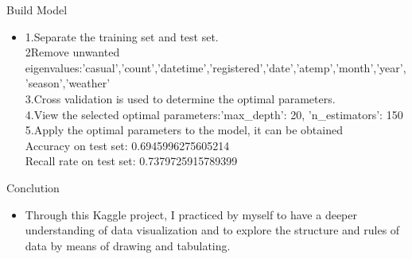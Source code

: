 \documentclass[
 size=14pt,
 paper=smartboard,  %
 mode=present, 		%
 display=slides, 	%
 style=tuliplab,  	%
 pauseslide,
 fleqn,leqno]{powerdot}
\begin{document}
\begin{slide}{Build Model}
  \begin{center}
  
  {
  \begin{itemize}
  \item 
  1.Separate the training set and test set.\\
  2Remove unwanted eigenvalues:'casual','count','datetime','registered','date','atemp','month','year','season','weather'\\
  3.Cross validation is used to determine the optimal parameters.\\
  4.View the selected optimal parameters:{'max_depth': 20, 'n_estimators': 150}\\
  5.Apply the optimal parameters to the model, it can be obtained\\
  Accuracy on test set:  0.6945996275605214\\
  Recall rate on test set: 0.7379725915789399\\
  \end{itemize}
  }
  
  \end{center}
  \bigskip
  \begin{center}
  
  \end{center}
  \bigskip
\end{slide}


\begin{slide}{Conclution}
  \begin{center}
  
  {
  \begin{itemize}
  \item 
  Through this Kaggle project, I practiced by myself to have a deeper understanding of data visualization and to explore the structure and rules of data by means of drawing and tabulating.
  
  \end{itemize}
  }
  
  \end{center}
  \bigskip
  \begin{center}
  
  \end{center}
  \bigskip
  
  
  
  \end{slide}
\end{document}
